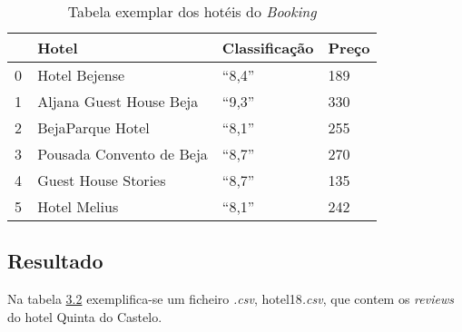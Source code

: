 \begin{table}[!ht]
  \centering
  \begin{tabular}{|l|l|l|l|}
    \hline
    ~  & Hotel                                              & Classificação & Preço \\ \hline
    0  & Hotel Bejense                                      & ``8,4''       & 189   \\ \hline
    1  & Aljana Guest House Beja                            & ``9,3''       & 330   \\ \hline
    2  & BejaParque Hotel                                   & ``8,1''       & 255   \\ \hline
    3  & Pousada Convento de Beja                           & ``8,7''       & 270   \\ \hline
    4  & Guest House Stories                                & ``8,7''       & 135   \\ \hline
    5  & Hotel Melius                                       & ``8,1''       & 242   \\ \hline
  \end{tabular}
  \caption{Tabela exemplar dos hotéis do \textit{Booking}}
  \label{table:2}
\end{table}

\subsection{Resultado}

Na tabela \hyperref[table:3]{3.2} exemplifica-se um ficheiro \textit{.csv}, hotel18\textit{.csv}, que contem os \textit{reviews} do hotel Quinta do Castelo.

